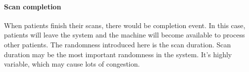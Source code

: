 \paragraph{Scan completion} When patients finish their scans, there would be completion event. In this case, patients will leave the system and the machine will become available to process other patients. The randomness introduced here is the scan duration. Scan duration may be the most important randomness in the system. It's highly variable, which may cause lots of congestion.

